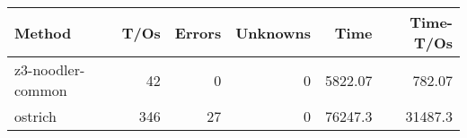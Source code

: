 \begin{tabular}{lrrrrr}
\hline
 Method            &   T/Os &   Errors &   Unknowns &     Time &   Time-T/Os \\
\hline
 z3-noodler-common &     42 &        0 &          0 &  5822.07 &      782.07 \\
 ostrich           &    346 &       27 &          0 & 76247.3  &    31487.3  \\
\hline
\end{tabular}
